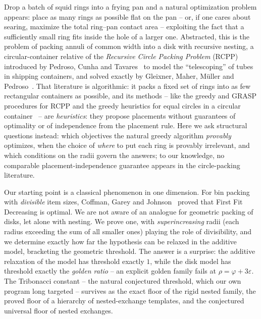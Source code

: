 \documentclass[11pt]{article}
\theoremstyle{definition}
\begin{document}
Drop a batch of squid rings into a frying pan and a natural optimization
problem appears: place as many rings as possible flat on the pan -- or, if one
cares about searing, maximize the total ring--pan contact area -- exploiting the
fact that a sufficiently small ring fits inside the hole of a larger one.
Abstracted, this is the problem of packing annuli of common width into a disk
with recursive nesting, a circular-container relative of the
\emph{Recursive Circle Packing Problem} (RCPP) introduced by Pedroso, Cunha and
Tavares~\cite{PedrosoCunhaTavares2016} to model the ``telescoping'' of tubes in
shipping containers, and solved exactly by Gleixner, Maher, M\"uller and
Pedroso~\cite{Gleixner2020}. That literature is algorithmic: it packs a fixed
set of rings into as few rectangular containers as possible, and its
methods -- like the greedy and GRASP procedures for RCPP and the greedy
heuristics for equal circles in a circular
container~\cite{PedrosoCunhaTavares2016,ChenEtAl2018} -- are
\emph{heuristics}: they propose placements without guarantees of
optimality or of independence from the placement rule. Here we ask
structural questions instead: which objectives the natural greedy
algorithm \emph{provably} optimizes, when the choice of \emph{where} to
put each ring is provably irrelevant, and which conditions on the radii
govern the answers; to our knowledge, no comparable
placement-independence guarantee appears in the circle-packing literature.

Our starting point is a classical phenomenon in one dimension. For bin packing
with \emph{divisible} item sizes, Coffman, Garey and
Johnson~\cite{CoffmanGareyJohnson1987} proved that First Fit Decreasing is
optimal. We are not aware of an analogue for geometric packing of disks, let
alone with nesting. We prove one, with \emph{superincreasing} radii (each radius exceeding
the sum of all smaller ones) playing the role of divisibility, and we
determine exactly how far the hypothesis can be relaxed in the additive
model, bracketing the geometric threshold. The answer is a
surprise: the additive relaxation of the model has threshold exactly $1$,
while the disk model has threshold exactly the
\emph{golden ratio} -- an explicit golden family fails at
$\rho=\varphi+3\varepsilon$. The Tribonacci constant -- the natural
conjectured threshold, which our own program long targeted -- survives as
the exact floor of the rigid nested family, the proved floor of a
hierarchy of nested-exchange templates, and the conjectured universal
floor of nested exchanges.
\end{document}
